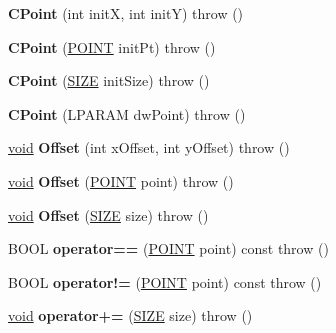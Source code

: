 \begin{DoxyCompactItemize}
\item 
\mbox{\label{class_c_point_ab3132cca1b4d5320334a6afcbff6b8dd}} 
{\bfseries C\+Point} (int initX, int initY)  throw ()
\item 
\mbox{\label{class_c_point_a9f0c5e989a61185e8425554be59e5581}} 
{\bfseries C\+Point} (\hyperlink{structtag_p_o_i_n_t}{P\+O\+I\+NT} init\+Pt)  throw ()
\item 
\mbox{\label{class_c_point_afff41dccc3c643af2a7f3762d82fab22}} 
{\bfseries C\+Point} (\hyperlink{structtag_s_i_z_e}{S\+I\+ZE} init\+Size)  throw ()
\item 
\mbox{\label{class_c_point_aef84ca8b49d9bdcc5c8f804ab3a01c23}} 
{\bfseries C\+Point} (L\+P\+A\+R\+AM dw\+Point)  throw ()
\item 
\mbox{\label{class_c_point_a2d2ed32e5f0ade7e68cae4ebd096c872}} 
\hyperlink{interfacevoid}{void} {\bfseries Offset} (int x\+Offset, int y\+Offset)  throw ()
\item 
\mbox{\label{class_c_point_a2a2cfb760ac562ece5aeb4451d832322}} 
\hyperlink{interfacevoid}{void} {\bfseries Offset} (\hyperlink{structtag_p_o_i_n_t}{P\+O\+I\+NT} point)  throw ()
\item 
\mbox{\label{class_c_point_aaffae686444a37ff8eafe30205a71f83}} 
\hyperlink{interfacevoid}{void} {\bfseries Offset} (\hyperlink{structtag_s_i_z_e}{S\+I\+ZE} size)  throw ()
\item 
\mbox{\label{class_c_point_a49401415266d172ad87478437b959ac0}} 
B\+O\+OL {\bfseries operator==} (\hyperlink{structtag_p_o_i_n_t}{P\+O\+I\+NT} point) const  throw ()
\item 
\mbox{\label{class_c_point_af14f5281cbd7a7b57877f78369bc43d9}} 
B\+O\+OL {\bfseries operator!=} (\hyperlink{structtag_p_o_i_n_t}{P\+O\+I\+NT} point) const  throw ()
\item 
\mbox{\label{class_c_point_ae87715648c8df9f612406fa099d39fce}} 
\hyperlink{interfacevoid}{void} {\bfseries operator+=} (\hyperlink{structtag_s_i_z_e}{S\+I\+ZE} size)  throw ()

\end{DoxyCompactItemize}
